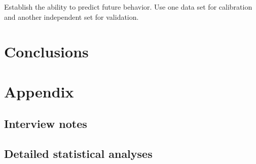 \documentclass[11pt,a4paper]{article}
\begin{document}
Establish the ability to predict future behavior. Use one data set for calibration and another independent set for validation.



\section{Conclusions}

\section{Appendix}

\subsection{Interview notes}

\subsection{Detailed statistical analyses}
\end{document}
